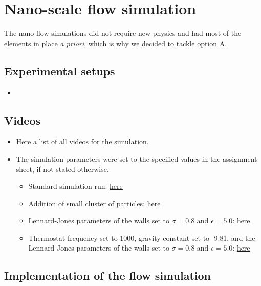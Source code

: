 \documentclass{article}
\begin{document}
\section{Nano-scale flow simulation}
\label{sec:nano}

The nano flow simulations did not require new physics and had most of the elements in place \textit{a priori}, which is why we decided to tackle option A.

\subsection{Experimental setups}
\label{sec:nano:exp}

    \begin{itemize}
        \item 
    \end{itemize}

\subsection{Videos}
\label{sec:nano:video}

    \begin{itemize}
        \item Here a list of all videos for the simulation.
        \item The simulation parameters were set to the specified values in the assignment sheet, if not stated otherwise.
        \begin{itemize}
            \item Standard simulation run: \href{https://youtu.be/-eWISjhgIgA}{here}
            \item Addition of small cluster of particles: \href{https://youtu.be/G34H3SCnpW0}{here}
            \item Lennard-Jones parameters of the walls set to $\sigma = 0.8$ and $\epsilon = 5.0$: \href{https://youtu.be/I4h6tjnJVuI}{here}
            \item Thermostat frequency set to 1000, gravity constant set to -9.81, and the Lennard-Jones parameters of the walls set to $\sigma = 0.8$ and $\epsilon = 5.0$: \href{https://youtu.be/yxNYmXJg5r0}{here}
        \end{itemize}
    \end{itemize}

\subsection{Implementation of the flow simulation}
\label{sec:nano:impl}
\end{document}
